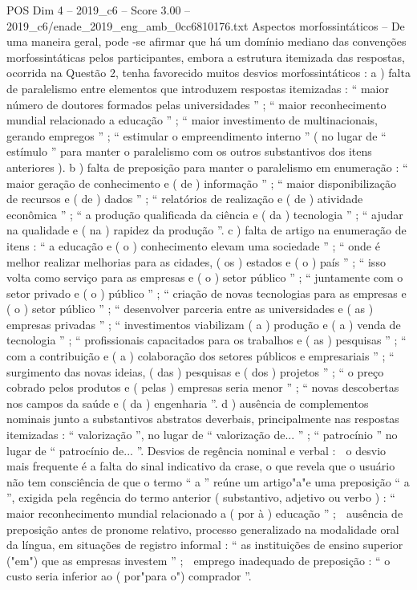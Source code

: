 \begin{textsample}{POS Dim 4 – 2019\_c6 – Score 3.00 – 2019\_c6/enade\_2019\_eng\_amb\_0cc6810176.txt}
Aspectos morfossintáticos – De uma maneira geral, pode -se afirmar que há um domínio mediano das convenções morfossintáticas pelos participantes, embora a estrutura itemizada das respostas, ocorrida na Questão 2, tenha favorecido muitos desvios morfossintáticos : a ) falta de paralelismo entre elementos que introduzem respostas itemizadas : “ maior número de doutores formados pelas universidades ” ; “ maior reconhecimento mundial relacionado a educação ” ; “ maior investimento de multinacionais, gerando empregos ” ; “ estimular o empreendimento interno ” ( no lugar de “ estímulo ” para manter o paralelismo com os outros substantivos dos itens anteriores ). b ) falta de preposição para manter o paralelismo em enumeração : “ maior geração de conhecimento e ( de ) informação ” ; “ maior disponibilização de recursos e ( de ) dados ” ; “ relatórios de realização e ( de ) atividade econômica ” ; “ a produção qualificada da ciência e ( da ) tecnologia ” ; “ ajudar na qualidade e ( na ) rapidez da produção ”. c ) falta de artigo na enumeração de itens : “ a educação e ( o ) conhecimento elevam uma sociedade ” ; “ onde é melhor realizar melhorias para as cidades, ( os ) estados e ( o ) país ” ; “ isso volta como serviço para as empresas e ( o ) setor público ” ; “ juntamente com o setor privado e ( o ) público ” ; “ criação de novas tecnologias para as empresas e ( o ) setor público ” ; “ desenvolver parceria entre as universidades e ( as ) empresas privadas ” ; “ investimentos viabilizam ( a ) produção e ( a ) venda de tecnologia ” ; “ profissionais capacitados para os trabalhos e ( as ) pesquisas ” ; “ com a contribuição e ( a ) colaboração dos setores públicos e empresariais ” ; “ surgimento das novas ideias, ( das ) pesquisas e ( dos ) projetos ” ; “ o preço cobrado pelos produtos e ( pelas ) empresas seria menor ” ; “ novas descobertas nos campos da saúde e ( da ) engenharia ”. d ) ausência de complementos nominais junto a substantivos abstratos deverbais, principalmente nas respostas itemizadas : “ valorização ”, no lugar de “ valorização de... ” ; “ patrocínio ” no lugar de “ patrocínio de... ”.
Desvios de regência nominal e verbal :  o desvio mais frequente é a falta do sinal indicativo da crase, o que revela que o usuário não tem consciência de que o termo “ a ” reúne um artigo"a"e uma preposição “ a ”, exigida pela regência do termo anterior ( substantivo, adjetivo ou verbo ) : “ maior reconhecimento mundial relacionado a ( por à ) educação ” ;  ausência de preposição antes de pronome relativo, processo generalizado na modalidade oral da língua, em situações de registro informal : “ as instituições de ensino superior ("em") que as empresas investem ” ;  emprego inadequado de preposição : “ o custo seria inferior ao ( por"para o") comprador ”.

\end{textsample}
